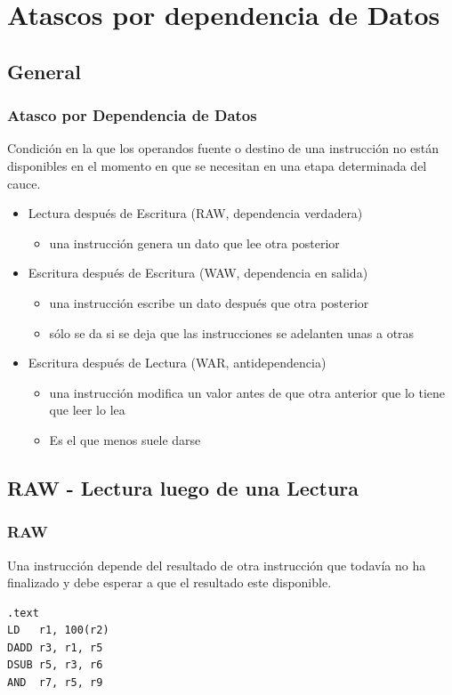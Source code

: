 \documentclass{beamer}
\begin{document}
\section{Atascos por dependencia de Datos}
\subsection{General}

\begin{frame}
\frametitle{Atasco por Dependencia de Datos}

Condición en la que los operandos fuente o destino de una instrucción no están disponibles en el momento en que se necesitan en una etapa determinada del cauce.
\begin{itemize}

\item Lectura después de Escritura (RAW, dependencia verdadera)
\begin{itemize}
\item  una instrucción genera un dato que lee otra posterior
\end{itemize}

\item Escritura después de Escritura (WAW, dependencia en salida)
\begin{itemize}
\item una instrucción escribe un dato después que otra posterior
\item sólo se da si se deja que las instrucciones se adelanten unas a otras
\end{itemize}

\item Escritura después de Lectura (WAR, antidependencia)
\begin{itemize}
\item una instrucción modifica un valor antes de que otra anterior que lo tiene que leer lo lea
\item Es el que menos suele darse
\end{itemize}
\end{itemize}
\end{frame}

\subsection{RAW - Lectura luego de una Lectura}
\begin{frame}[fragile]
\frametitle{RAW}
Una instrucción depende del resultado de otra instrucción que todavía no ha finalizado y debe esperar a que el resultado este disponible.
\begin{block}{}
\begin{lstlisting}[language=WinMIPS64,basicstyle=\ttfamily,keywordstyle=\color{blue}]
.text
LD   r1, 100(r2)
DADD r3, r1, r5
DSUB r5, r3, r6
AND  r7, r5, r9
\end{lstlisting}
\end{block}

\end{frame}
\end{document}
